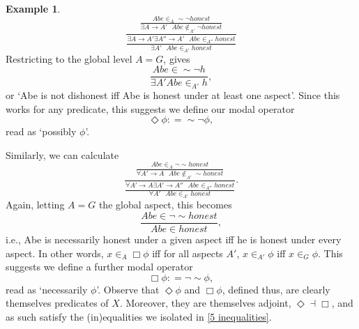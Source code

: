 \documentclass[11pt]{book}
\theoremstyle{definition}
\newtheorem{example}{Example}[section]
\theoremstyle{definition}
\theoremstyle{definition}
\theoremstyle{theorem}
\theoremstyle{definition}
\begin{document}
\begin{example}
	\begin{equation*}
	\frac{\frac{Abe \in_A \sim \neg honest}{\exists A \rightarrow A' \text{ } Abe \notin_{A'} \neg honest}}{\frac{\exists A \rightarrow A' \exists A'' \rightarrow A' \text{ } Abe \in_{A''} honest}{\exists A' \text{ } Abe \in_{A'} honest}}
	\end{equation*}
	Restricting to the global level $A = G$, gives 
	\begin{equation*}
	\frac{Abe \in \sim \neg h}{\exists A' Abe \in_{A'} h},
	\end{equation*}
	or `Abe is not dishonest iff Abe is honest under at least one aspect'. Since this works for any predicate, this suggests we define our modal operator
	\begin{equation*}
	\Diamond \phi : = \sim \neg \phi,
	\end{equation*}
	read as `possibly $\phi$'. \par \noindent 
	Similarly, we can calculate 
	\begin{equation*}
	\frac{\frac{Abe \in_A \neg \sim honest}{\forall A' \rightarrow A \text{ } Abe \notin_{A'} \sim honest}}{\frac{\forall A' \rightarrow A \exists A' \rightarrow A'' \text{ } Abe \in_{A''} honest}{\forall A' \text{ } Abe \in_{A'} honest}}.
	\end{equation*}
	Again, letting $A = G$ the global aspect, this becomes 
	\begin{equation*}
	\frac{Abe \in \neg \sim honest}{Abe \in honest},
	\end{equation*}
	i.e., Abe is necessarily honest under a given aspect iff he is honest under every aspect. In other words, $x \in_A \Box \phi$ iff for all aspects $A'$, $x \in_{A'} \phi$ iff $x \in_G \phi$.  
	This suggests we define a further modal operator
	\begin{equation*}
	\Box \phi : = \neg \sim \phi,
	\end{equation*}
	read as `necessarily $\phi$'. Observe that $\Diamond \phi$ and $\Box \phi$, defined thus, are clearly themselves predicates of $X$. Moreover, they are themselves adjoint, $\Diamond \dashv \Box$, and as such satisfy the (in)equalities we isolated in \ref{5 inequalities}.

\end{example}
\end{document}
